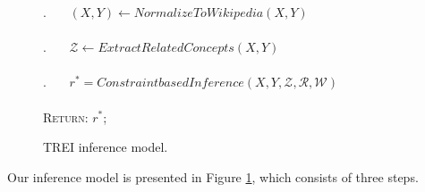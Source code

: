 \begin{figure}[!t]
\begin{centering}
{{\begin{minipage}{6in}
\begin{tabbing}
            . ~~~$(X, Y) \leftarrow NormalizeToWikipedia(X,Y)$ \\
            \\     
            . ~~~$\mathcal{Z} \leftarrow ExtractRelatedConcepts(X,Y)$ \\
            \\
            . ~~~$r^* = ConstraintbasedInference(X,Y,\mathcal{Z},\mathcal{R},\mathcal{W})$ \\
            \\
            \qquad \textsc{Return}: $r^*$;
          \end{tabbing}
        \end{minipage}
      } }
\end{centering}
\caption{TREI inference model.}
\label{fig:rel-know-iden-alg}
\end{figure}

Our inference model is presented in Figure \ref{fig:rel-know-iden-alg},
which consists of three steps.

